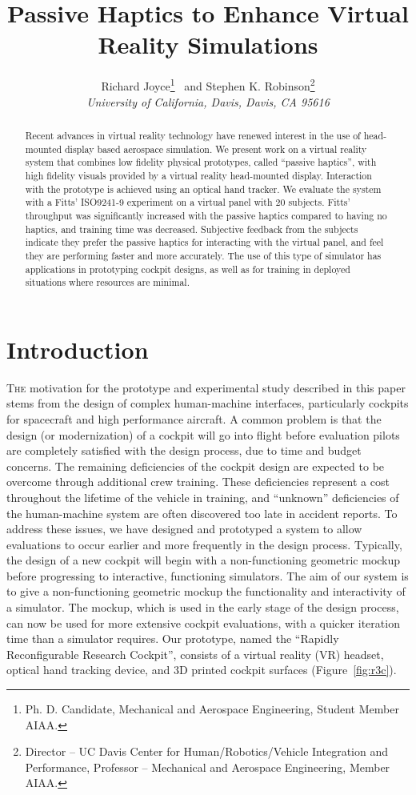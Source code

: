 \documentclass[]{aiaa-tc}%
\title{Passive Haptics to Enhance Virtual Reality Simulations}
\author{Richard Joyce\thanks{Ph. D. Candidate, Mechanical and Aerospace Engineering, Student Member AIAA.}
  \ and Stephen K. Robinson\thanks{Director – UC Davis Center for Human/Robotics/Vehicle Integration and Performance, Professor – Mechanical and Aerospace Engineering, Member AIAA.}\\
  {\normalsize\itshape University of California, Davis, Davis, CA 95616}\\
 }
\begin{document}
\maketitle

\begin{abstract}
Recent advances in virtual reality technology have renewed interest in the use of head-mounted display based aerospace simulation.
We present work on a virtual reality system that combines low fidelity physical prototypes, called ``passive haptics'', with high fidelity visuals provided by a virtual reality head-mounted display.
Interaction with the prototype is achieved using an optical hand tracker.
We evaluate the system with a Fitts' ISO9241-9 experiment on a virtual panel with 20 subjects.
Fitts' throughput was significantly increased with the passive haptics compared to having no haptics, and training time was decreased.
Subjective feedback from the subjects indicate they prefer the passive haptics for interacting with the virtual panel, and feel they are performing faster and more accurately.
The use of this type of simulator has applications in prototyping cockpit designs, as well as for training in deployed situations where resources are minimal.
\end{abstract}

\section{Introduction}
\lettrine[nindent=0pt]{T}{he} motivation for the prototype and experimental study described in this paper stems from the design of complex human-machine interfaces, particularly cockpits for spacecraft and high performance aircraft.
A common problem is that the design (or modernization) of a cockpit will go into flight before evaluation pilots are completely satisfied with the design process, due to time and budget concerns.
The remaining deficiencies of the cockpit design are expected to be overcome through additional crew training.
These deficiencies represent a cost throughout the lifetime of the vehicle in training, and ``unknown'' deficiencies of the human-machine system are often discovered too late in accident reports.
To address these issues, we have designed and prototyped a system to allow evaluations to occur earlier and more frequently in the design process.
Typically, the design of a new cockpit will begin with a non-functioning geometric mockup before progressing to interactive, functioning simulators.
The aim of our system is to give a non-functioning geometric mockup the functionality and interactivity of a simulator.
The mockup, which is used in the early stage of the design process, can now be used for more extensive cockpit evaluations, with a quicker iteration time than a simulator requires.
Our prototype, named the ``Rapidly Reconfigurable Research Cockpit'', consists of a virtual reality (VR) headset, optical hand tracking device, and 3D printed cockpit surfaces (Figure~\ref{fig:r3c})\cite{joyce_rapidly_2015}.
\end{document}
